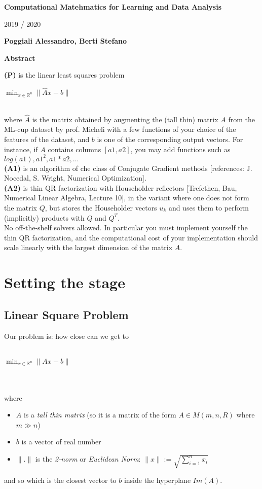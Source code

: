 \documentclass{article}
\begin{document}
\thispagestyle{plain}
\begin{center}
    \Large
    \textbf{Computational Matehmatics for Learning and Data Analysis}
        
    \vspace{0.4cm}
    \large
    2019 / 2020
        
    \vspace{0.4cm}
    \textbf{Poggiali Alessandro, Berti Stefano}
       
    \vspace{0.9cm}
    \textbf{Abstract}
\end{center}
\textbf{(P)} is the linear least squares problem
\\\centerline{$\min_{x \in \mathds{R}^n}\|\hat{A}x-b\|$}
\\where $\hat{A}$ is the matrix obtained by augmenting the (tall thin) matrix $A$ from the ML-cup dataset by prof. Micheli with a few functions of your choice of the features of the dataset, and $b$ is one of the corresponding output vectors. For instance, if $A$ contains columns $[a1, a2]$, you may add functions such as $log(a1), a1^{2}, a1*a2, \hdots$
\\\textbf{(A1)} is an algorithm of che class of Conjugate Gradient methods [references: J. Nocedal, S. Wright, Numerical Optimization].
\\\textbf{(A2)} is thin QR factorization with Householder reflectors [Trefethen, Bau, Numerical Linear Algebra, Lecture 10], in the variant where one does not form the matrix $Q$, but stores the Householder vectors $u_{k}$ and uses them to perform (implicitly) products with $Q$ and $Q^{T}$.
\\No off-the-shelf solvers allowed. In particular you must implement yourself the thin QR factorization, and the computational cost of your implementation should scale linearly with the largest dimension of the matrix $A$.

\section{Setting the stage}

\subsection{Linear Square Problem}
Our problem is: how close can we get to \\\\
\centerline{$\min_{x \in \mathds{R}^n}\|Ax-b\|$} \\\\
where
\begin{itemize}
	\item $A$ is a \textit{tall thin matrix} (so it is a matrix of the form $A\in M(m, n, R)$ where $m \gg n$)
	\item $b$ is a vector of real number
	\item $\|.\|$ is the \textit{2-norm} or \textit{Euclidean Norm}: $\|x\| := \sqrt{\sum_{i=1}^n x_i}$
\end{itemize}
and so which is the closest vector to $b$ inside the hyperplane $Im(A)$.
\end{document}
